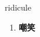 
\begin{frame}
{\huge ridicule}
\begin{center}
\begin{enumerate}\Large
  \item \textbf{嘲笑}
\end{enumerate}
\end{center}
\end{frame}
